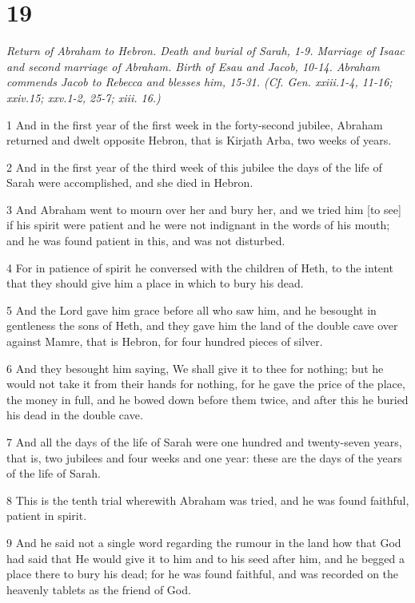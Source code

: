 \chapter{19}

\par \textit{Return of Abraham to Hebron. Death and burial of Sarah, 1-9. Marriage of Isaac and second marriage of Abraham. Birth of Esau and Jacob, 10-14. Abraham commends Jacob to Rebecca and blesses him, 15-31. (Cf. Gen. xxiii.1-4, 11-16; xxiv.15; xxv.1-2, 25-7; xiii. 16.)}

\par 1 And in the first year of the first week in the forty-second jubilee, Abraham returned and dwelt opposite Hebron, that is Kirjath Arba, two weeks of years.
\par 2 And in the first year of the third week of this jubilee the days of the life of Sarah were accomplished, and she died in Hebron.
\par 3 And Abraham went to mourn over her and bury her, and we tried him [to see] if his spirit were patient and he were not indignant in the words of his mouth; and he was found patient in this, and was not disturbed.
\par 4 For in patience of spirit he conversed with the children of Heth, to the intent that they should give him a place in which to bury his dead.
\par 5 And the Lord gave him grace before all who saw him, and he besought in gentleness the sons of Heth, and they gave him the land of the double cave over against Mamre, that is Hebron, for four hundred pieces of silver.
\par 6 And they besought him saying, We shall give it to thee for nothing; but he would not take it from their hands for nothing, for he gave the price of the place, the money in full, and he bowed down before them twice, and after this he buried his dead in the double cave.
\par 7 And all the days of the life of Sarah were one hundred and twenty-seven years, that is, two jubilees and four weeks and one year: these are the days of the years of the life of Sarah.
\par 8 This is the tenth trial wherewith Abraham was tried, and he was found faithful, patient in spirit.
\par 9 And he said not a single word regarding the rumour in the land how that God had said that He would give it to him and to his seed after him, and he begged a place there to bury his dead; for he was found faithful, and was recorded on the heavenly tablets as the friend of God.
